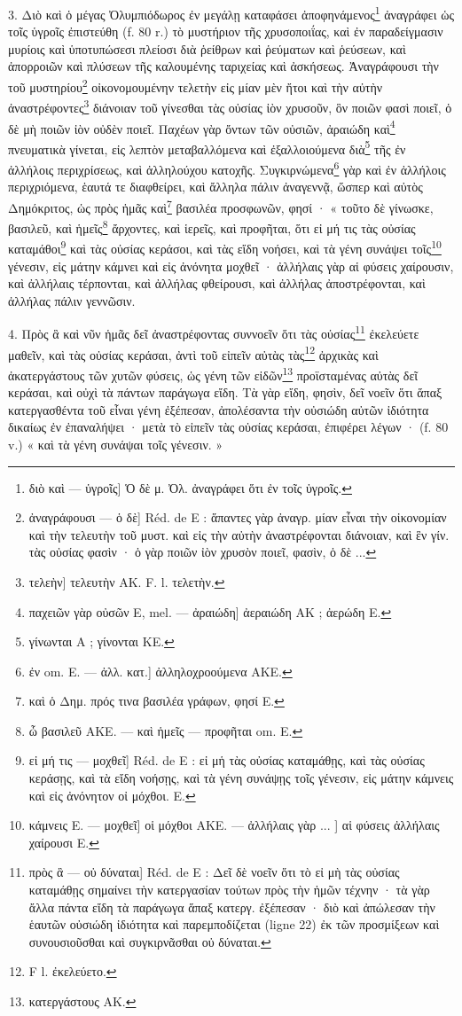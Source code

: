 \documentclass[a4paper, 11pt, oneside, polutonikogreek, french]{article}
\begin{document}
3. Διὸ καὶ ὁ μέγας Ὀλυμπιόδωρος ἐν μεγάλῃ καταφάσει ἀποφηνάμενος\footnote{διὸ καὶ --- ὑγροῖς] Ὁ δὲ μ. Ὀλ. ἀναγράφει ὅτι ἐν τοῖς ὑγροῖς.} ἀναγράφει ὡς τοῖς ὑγροῖς ἐπιστεύθη (f. 80 r.) τὸ μυστήριον τῆς χρυσοποιΐας, καὶ ἐν παραδείγμασιν μυρίοις καὶ ὑποτυπώσεσι πλείοσι διὰ ῥείθρων καὶ ῥεύματων καὶ ῥεύσεων, καὶ ἀπορροιῶν καὶ πλύσεων τῆς καλουμένης ταριχείας καὶ ἀσκήσεως. Ἀναγράφουσι τὴν τοῦ μυστηρίου\footnote{ἀναγράφουσι --- ὁ δὲ] Réd. de E : ἅπαντες γὰρ ἀναγρ. μίαν εἶναι τὴν οἰκονομίαν καὶ τὴν τελευτὴν τοῦ μυστ. καὶ εἰς τὴν αὐτὴν ἀναστρέφονται διάνοιαν, καὶ ἓν γίν. τὰς οὐσίας φασὶν · ὁ γὰρ ποιῶν ἰὸν χρυσὸν ποιεῖ, φασὶν, ὁ δὲ ...} οἰκονομουμένην τελετὴν εἰς μίαν μὲν ἤτοι καὶ τὴν αὐτὴν ἀναστρέφοντες\footnote{τελεὴν] τελευτὴν AK. F. l. τελετὴν.} διάνοιαν τοῦ γίνεσθαι τὰς οὐσίας ἰὸν χρυσοῦν, ὃν ποιῶν φασὶ ποιεῖ, ὁ δὲ μὴ ποιῶν ἰὸν οὐδὲν ποιεῖ. Παχέων γὰρ ὄντων τῶν οὐσιῶν, ἀραιώδη καὶ\footnote{παχειῶν γὰρ οὐσῶν E, mel. --- ἀραιώδη] ἀεραιώδη AK ; ἀερώδη E.} πνευματικὰ γίνεται, εἰς λεπτὸν μεταβαλλόμενα καὶ ἐξαλλοιούμενα διὰ\footnote{γίνωνται A ; γίνονται ΚE.} τῆς ἐν ἀλλήλοις περιχρίσεως, καὶ ἀλληλούχου κατοχῆς. Συγκιρνώμενα\footnote{ἐν om. E. --- ἀλλ. κατ.] ἀλληλοχροούμενα AKE.} γὰρ καὶ ἐν ἀλλήλοις περιχριόμενα, ἑαυτά τε διαφθείρει, καὶ ἄλληλα πάλιν ἀναγεννᾷ, ὥσπερ καὶ αὐτὸς Δημόκριτος, ὡς πρὸς ἡμᾶς καὶ\footnote{καὶ ὁ Δημ. πρός τινα βασιλέα γράφων, φησί E.} βασιλέα προσφωνῶν, φησί · « τοῦτο δὲ γίνωσκε, βασιλεῦ, καὶ ἡμεῖς\footnote{ὦ βασιλεῦ AKE. --- καὶ ἡμεῖς --- προφῆται om. E.} ἄρχοντες, καὶ ἱερεῖς, καὶ προφῆται, ὅτι εἰ μή τις τὰς οὐσίας καταμάθοι\footnote{εἰ μή τις --- μοχθεῖ] Réd. de E : εἰ μἡ τὰς οὐσίας καταμάθῃς, καὶ τὰς οὐσίας κεράσῃς, καὶ τὰ εἴδη νοήσῃς, καὶ τὰ γένη συνάψῃς τοῖς γένεσιν, εἰς μάτην κάμνεις καὶ εἰς ἀνόνητον οἰ μόχθοι. E.} καὶ τὰς οὐσίας κεράσοι, καὶ τὰς εἴδη νοήσει, καὶ τὰ γένη συνάψει τοῖς\footnote{κάμνεις E. --- μοχθεῖ] οἱ μόχθοι AKE. --- ἀλλήλαις γὰρ ... ] αἱ φύσεις ἀλλήλαις χαίρουσι E.} γένεσιν, εἰς μάτην κάμνει καὶ εἰς ἀνόνητα μοχθεῖ · ἀλλήλαις γὰρ αἱ φύσεις χαίρουσιν, καὶ ἀλλήλαις τέρπονται, καὶ ἀλλήλας φθείρουσι, καὶ ἀλλήλας ἀποστρέφονται, καὶ ἀλλήλας πάλιν γεννῶσιν.

4. Πρὸς ἃ καὶ νῦν ἡμᾶς δεῖ ἀναστρέφοντας συννοεῖν ὅτι τὰς οὐσίας\footnote{πρὸς ἃ --- οὐ δύναται] Réd. de E : Δεῖ δὲ νοεῖν ὅτι τὸ εἰ μὴ τὰς οὐσίας καταμάθῃς σημαίνει τὴν κατεργασίαν τούτων πρὸς τὴν ἡμῶν τέχνην · τὰ γὰρ ἄλλα πάντα εἴδη τὰ παράγωγα ἅπαξ κατεργ. ἐξέπεσαν · διὸ καὶ ἀπώλεσαν τὴν ἑαυτῶν οὐσιώδη ἰδιότητα καὶ παρεμποδίζεται (ligne 22) ἐκ τῶν προσμίξεων καὶ συνουσιοῦσθαι καὶ συγκιρνᾶσθαι οὐ δύναται.} ἐκελεύετε μαθεῖν, καὶ τὰς οὐσίας κεράσαι, ἀντὶ τοῦ εἰπεῖν αὐτὰς τὰς\footnote{F l. ἐκελεύετο.} ἀρχικὰς καὶ ἀκατεργάστους τῶν χυτῶν φύσεις, ὡς γένη τῶν εἰδῶν\footnote{κατεργάστους AK.} προϊσταμένας αὐτὰς δεῖ κεράσαι, καὶ οὐχὶ τὰ πάντων παράγωγα εἴδη. Τὰ γὰρ εἴδη, φησὶν, δεῖ νοεῖν ὅτι ἅπαξ κατεργασθέντα τοῦ εἶναι γένη ἐξέπεσαν, ἀπολέσαντα τὴν οὐσιώδη αὐτῶν ἰδιότητα δικαίως ἐν ἐπαναλήψει · μετὰ τὸ εἰπεῖν τὰς οὐσίας κεράσαι, ἐπιφέρει λέγων · (f. 80 v.) « καὶ τὰ γένη συνάψαι τοῖς γένεσιν. »
\end{document}
